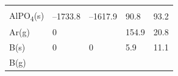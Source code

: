 \documentclass[
  9pt,
]{extbook}
\theoremstyle{definition}
\theoremstyle{definition}
\theoremstyle{definition}
\theoremstyle{remark}
\begin{document}
\begin{longtable}[]{@{}lllll@{}}
\begin{minipage}[t]{0.18\columnwidth}
\strut
\end{minipage}\tabularnewline
\begin{minipage}[t]{0.10\columnwidth}\raggedright
AlPO\textsubscript{4}(s)\strut
\end{minipage} & \begin{minipage}[t]{0.19\columnwidth}\raggedright
--1733.8\strut
\end{minipage} & \begin{minipage}[t]{0.20\columnwidth}\raggedright
--1617.9\strut
\end{minipage} & \begin{minipage}[t]{0.18\columnwidth}\raggedright
90.8\strut
\end{minipage} & \begin{minipage}[t]{0.18\columnwidth}\raggedright
93.2\strut
\end{minipage}\tabularnewline
\begin{minipage}[t]{0.10\columnwidth}\raggedright
Ar(g)\strut
\end{minipage} & \begin{minipage}[t]{0.19\columnwidth}\raggedright
0\strut
\end{minipage} & \begin{minipage}[t]{0.20\columnwidth}\raggedright
\strut
\end{minipage} & \begin{minipage}[t]{0.18\columnwidth}\raggedright
154.9\strut
\end{minipage} & \begin{minipage}[t]{0.18\columnwidth}\raggedright
20.8\strut
\end{minipage}\tabularnewline
\begin{minipage}[t]{0.10\columnwidth}\raggedright
B(s)\strut
\end{minipage} & \begin{minipage}[t]{0.19\columnwidth}\raggedright
0\strut
\end{minipage} & \begin{minipage}[t]{0.20\columnwidth}\raggedright
0\strut
\end{minipage} & \begin{minipage}[t]{0.18\columnwidth}\raggedright
5.9\strut
\end{minipage} & \begin{minipage}[t]{0.18\columnwidth}\raggedright
11.1\strut
\end{minipage}\tabularnewline
\begin{minipage}[t]{0.10\columnwidth}\raggedright
B(g)\strut

\end{minipage}
\end{longtable}
\end{document}
